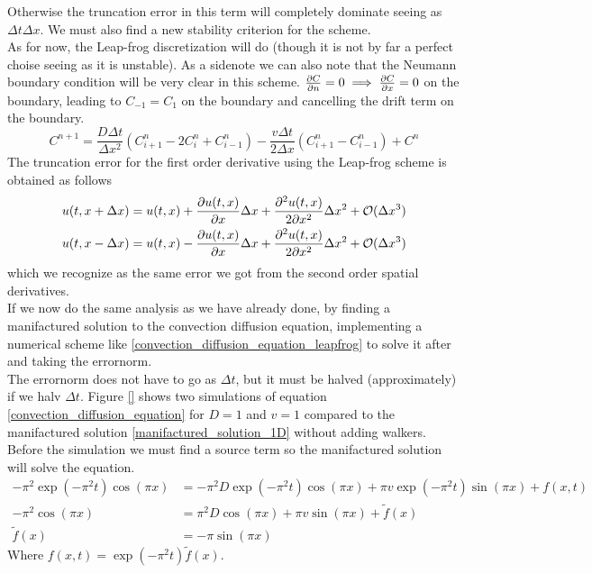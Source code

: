 Otherwise the truncation error in this term will completely dominate seeing as $\Delta t\Delta x$. 
We must also find a new stability criterion for the scheme. \\
As for now, the Leap-frog discretization will do (though it is not by far a perfect choise seeing as it is unstable). 
As a sidenote we can also note that the Neumann boundary condition will be very clear in this scheme. 
$\frac{\partial C}{\partial n} = 0 \implies \frac{\partial C}{\partial x} = 0 $ on the boundary, leading to $C_{-1} = C_{1}$ on the boundary and cancelling the drift term on the boundary.
\begin{equation}\label{convection_diffusion_equation_leapfrog}
 C^{n+1} = \frac{D\Delta t}{\Delta x^2}\left(C^n_{i+1}-2C^n_i+C^n_{i-1}\right)-\frac{v\Delta t}{2\Delta x}\left(C^n_{i+1}-C^n_{i-1}\right) + C^n
\end{equation}
The truncation error for the first order derivative using the Leap-frog scheme is obtained as follows
\begin{align*}
 u(t,x+\Delta x) = u(t,x) + \frac{\partial u(t,x)}{\partial x}\Delta x + \frac{\partial^2u(t,x)}{2\partial x^2}\Delta x^2 +\mathcal{O}(\Delta x^3)\\
 u(t,x-\Delta x) = u(t,x) - \frac{\partial u(t,x)}{\partial x}\Delta x + \frac{\partial^2u(t,x)}{2\partial x^2}\Delta x^2 +\mathcal{O}(\Delta x^3)
\end{align*}
which we recognize as the same error we got from the second order spatial derivatives.\\
If we now do the same analysis as we have already done, by finding a manifactured solution to the convection diffusion equation, implementing a numerical scheme like \ref{convection_diffusion_equation_leapfrog} to solve it after and taking the errornorm. \\
The errornorm does not have to go as $\Delta t$, but it must be halved (approximately) if we halv $\Delta t$. 
Figure \ref{} shows two simulations of equation \ref{convection_diffusion_equation} for $D =1$ and $v=1$ compared to the manifactured solution \ref{manifactured_solution_1D} without adding walkers. 
Before the simulation we must find a source term so the manifactured solution will solve the equation.
\begin{align*}
 -\pi^2\exp\left(-\pi^2t\right)\cos\left(\pi x\right) &= -\pi^2D\exp\left(-\pi^2t\right)\cos\left(\pi x\right) + \pi v \exp\left(-\pi^2t\right)\sin\left(\pi x\right) + f(x,t)\\
 -\pi^2\cos\left(\pi x\right) &= \pi^2D\cos\left(\pi x\right) +\pi v \sin\left(\pi x\right) + \tilde{f}(x) \\
 \tilde{f}(x) &= -\pi\sin\left(\pi x\right)
\end{align*}
Where $f(x,t) = \exp\left(-\pi^2t\right)\tilde{f}(x)$.

